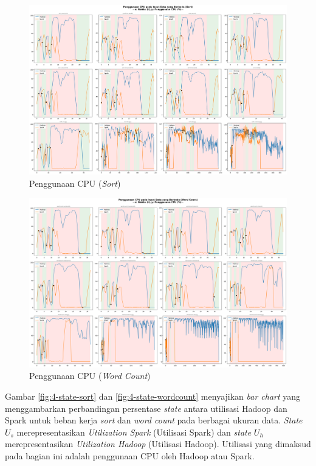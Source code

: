 \begin{landscape}
\begin{figure}[h]
    \centering
    \includegraphics[height=0.6\linewidth]{figures/ch04/4-penggunaan-cpu-all-sort.png}
    \caption{Penggunaan CPU (\textit{Sort})}
    \label{fig:4-penggunaan-cpu-all-sort}
\end{figure}
\end{landscape}

\begin{landscape}
\begin{figure}[h]
    \centering
    \includegraphics[height=0.6\linewidth]{figures/ch04/4-penggunaan-cpu-all-wordcount.png}
    \caption{Penggunaan CPU (\textit{Word Count})}
    \label{fig:4-penggunaan-cpu-all-wordcount}
\end{figure}
\end{landscape}

Gambar \ref{fig:4-state-sort} dan \ref{fig:4-state-wordcount} menyajikan \textit{bar chart} yang menggambarkan perbandingan persentase \textit{state} antara utilisasi Hadoop dan Spark untuk beban kerja \textit{sort} dan \textit{word count} pada berbagai ukuran data. \textit{State} $U_s$ merepresentasikan \textit{Utilization Spark} (Utilisasi Spark) dan \textit{state} $U_h$ merepresentasikan \textit{Utilization Hadoop} (Utilisasi Hadoop). Utilisasi yang dimaksud pada bagian ini adalah penggunaan CPU oleh Hadoop atau Spark.

